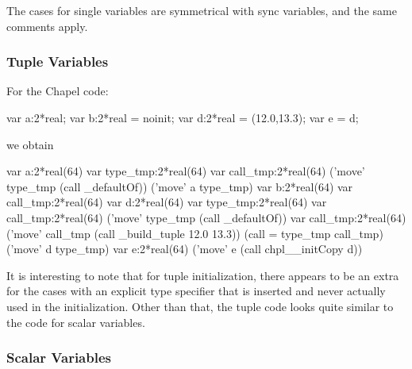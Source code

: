 The cases for single variables are symmetrical with sync variables, and the same comments
apply.

\subsubsection{Tuple Variables}

For the Chapel code:
\begin{chapel}
  var a:2*real;
  var b:2*real = noinit;
  var d:2*real = (12.0,13.3);
  var e = d;
\end{chapel}
\noindent
we obtain
\begin{numberedchapel}
    var a:2*real(64)
    {
      var type_tmp:2*real(64)
      var call_tmp:2*real(64)
      ('move' type_tmp (call _defaultOf))
      ('move' a type_tmp)
    }
    var b:2*real(64)
    var call_tmp:2*real(64)
    var d:2*real(64)
    {
      var type_tmp:2*real(64)
      var call_tmp:2*real(64)
      ('move' type_tmp (call _defaultOf))
      var call_tmp:2*real(64)
      ('move' call_tmp (call _build_tuple 12.0 13.3))
      (call = type_tmp call_tmp)
      ('move' d type_tmp)
    }
    var e:2*real(64)
    ('move' e (call chpl__initCopy d))
\end{numberedchapel}
\noindent
It is interesting to note that for tuple initialization, there appears to be an extra
 for the cases with an explicit type specifier that is inserted and never
actually used in the initialization.   Other than that, the tuple code looks quite similar
to the code for scalar variables.

\subsubsection{Scalar Variables}

